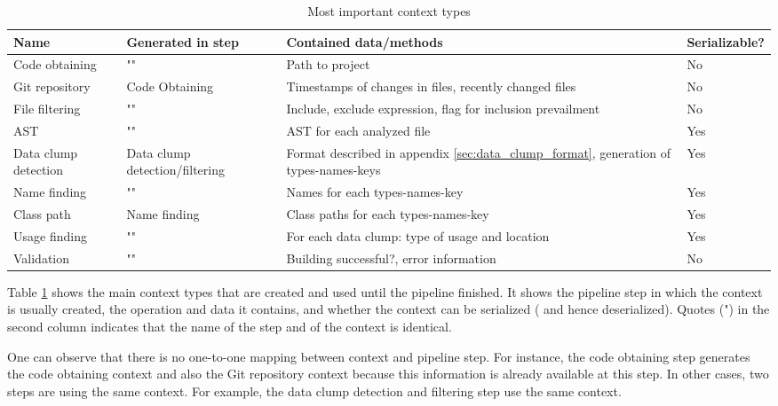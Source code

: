\begin{table}[ht!]
    \centering
    \begin{tabular}{m{3cm}|m{2cm}|m{5cm}|m{2cm}}
        Name & Generated in step & Contained data/methods & Serializable?  \\\hline
        Code obtaining & "" & Path to project & No \\\hline
        Git repository & Code Obtaining & Timestamps of changes in files, recently changed files & No \\\hline
        File filtering & "" & Include, exclude expression, flag for inclusion prevailment & No \\\hline

        AST & "" & \ac{AST} for each analyzed file &  Yes \\\hline
         Data clump detection & Data clump detection/filtering  & Format described in appendix \ref{sec:data_clump_format}, generation of types-names-keys & Yes \\\hline 
         Name finding & "" & Names for each types-names-key & Yes\\\hline

         Class path & Name finding & Class paths for each types-names-key & Yes\\\hline

         Usage finding & "" & For each data clump: type of usage and  location & Yes \\\hline

         Validation & "" & Building successful?, error information & No \\\hline
         
    \end{tabular}
    \caption{Most important context types}
    \label{tab:context_types}
\end{table}

Table \ref{tab:context_types} shows the main context types that are created and used until the pipeline finished. It shows the pipeline step in which the context is usually created, the operation and data it contains, and whether the context can be serialized ( and hence deserialized). Quotes (") in the second column indicates that the name of the step and of the context is identical. 

One can observe that there is no one-to-one mapping between context and pipeline step. For instance, the code obtaining step generates the code obtaining context and also the Git repository context because this information is already available at this step. In other cases, two steps are using the same context. For example, the data clump detection and filtering step use the same context.


